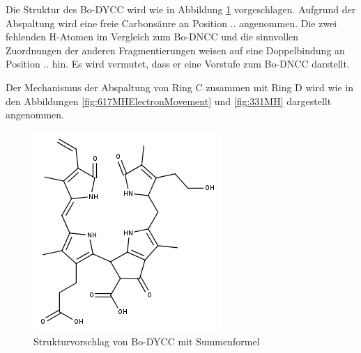 Die Struktur des Bo-DYCC  wird wie in Abbildung \ref{fig:617MHStruktur} vorgeschlagen. Aufgrund der  Abspaltung wird eine freie Carbonsäure an Position .. angenommen. Die zwei fehlenden H-Atomen im Vergleich zum Bo-DNCC und die sinnvollen Zuordnungen der anderen Fragmentierungen weisen auf eine Doppelbindung an Position .. hin. Es wird vermutet, dass er eine Vorstufe zum Bo-DNCC darstellt. 

Der Mechanismus der Abspaltung von Ring C zusammen mit Ring D wird wie in den Abbildungen \ref{fig:617MHElectronMovement} und \ref{fig:331MH} dargestellt angenommen. 

\begin{figure}[!htbp]
  \centering
  \includegraphics[scale=0.6]{figures/Kapitel7/Kataboliten/fragmentation_structures/VWA_Katabolit_617.png}
  \caption[Strukturvorschlag von Bo-DYCC, Quelle: Autor]{Strukturvorschlag von Bo-DYCC mit Summenformel }
  \label{fig:617MHStruktur}
\end{figure}


